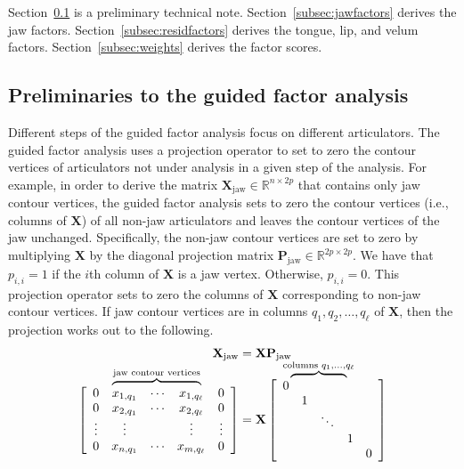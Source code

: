 \documentclass[preprint]{JASAnew}\usepackage[]{graphicx}\usepackage[]{color}
\newcommand\bovermat[2]{%
  \makebox[0pt][l]{$\smash{\overbrace{\phantom{%
    \begin{matrix}#2\end{matrix}}}^{#1}}$}#2}
\begin{document}
Section~\ref{subsec:preliminaries} is a preliminary technical note. Section~\ref{subsec:jawfactors} derives the jaw factors. Section~\ref{subsec:residfactors} derives the tongue, lip, and velum factors. Section~\ref{subsec:weights} derives the factor scores. 





\subsection{Preliminaries to the guided factor analysis}
\label{subsec:preliminaries}

Different steps of the guided factor analysis focus on different articulators.
%
The guided factor analysis uses a projection operator to set to zero the contour vertices of articulators not under analysis in a given step of the analysis.
% 
For example, in order to derive the matrix $\mathbf{X}_\text{jaw} \in \mathbb{R}^{n\times 2p}$ that contains only jaw contour vertices, the guided factor analysis sets to zero the contour vertices (i.e., columns of $\mathbf{X}$) of all non-jaw articulators and leaves the contour vertices of the jaw unchanged. 
%
Specifically, the non-jaw contour vertices are set to zero by multiplying $\mathbf{X}$  
% 
by the diagonal projection matrix $\mathbf{P}_\text{jaw} \in \mathbb{R}^{2p\times 2p}$. 
% 
We have that $p_{i,i}=1$ if the $i$th column of $\mathbf{X}$ is a jaw vertex. Otherwise, $p_{i,i}=0$. 
% 
This projection operator sets to zero the columns of $\mathbf{X}$ corresponding to non-jaw contour vertices. 
% 
If jaw contour vertices are in columns $q_1,q_2,\ldots,q_\ell$ of $\mathbf{X}$, then the projection works out to the following. 
% 
\begin{equation}
\begin{split}
  \mathbf{X}_\text{jaw} &= \mathbf{X} \mathbf{P}_\text{jaw} \\[10pt]
%
  \left[ {\begin{array}{ccccc}
   0 & \bovermat{\text{jaw contour vertices}}{x_{1,q_1} &  \cdots & x_{1,q_\ell}} & 0 \\
   0 & x_{2,q_1} &  \cdots & x_{2,q_\ell} & 0 \\
   \vdots & \vdots & & \vdots & \vdots \\
   0 & x_{n,q_1} & \cdots & x_{m,q_\ell} & 0 \\
  \end{array} } \right]
%
  &= 
%
   \mathbf{X}
%
   \left[ {\begin{array}{ccccc}
   \bovermat{\text{columns } q_1,\ldots,q_\ell}{0&&&&}\\
   & 1 &&&\\
   && \ddots &&\\
   &&& 1 &\\
   &&&& 0 \\
  \end{array} } \right]
\end{split}
\end{equation}
\end{document}
